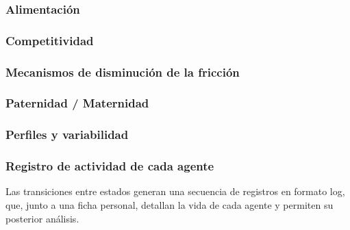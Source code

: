 \subsubsection{Alimentación}


\subsubsection{Competitividad}


\subsubsection{Mecanismos de disminución de la fricción}


\subsubsection{Paternidad / Maternidad}


\subsubsection{Perfiles y variabilidad}


\subsubsection{Registro de actividad de cada agente}

Las transiciones entre estados generan una secuencia de registros en formato log, que, junto a una ficha personal, detallan la vida de cada agente y permiten su posterior análisis.

